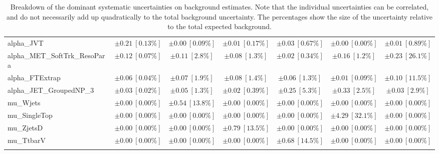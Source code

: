 \begin{sidewaystable}
\begin{center}
\begin{tabular*}{\textwidth}{@{\extracolsep{\fill}}lcccccc}
alpha\_JVT         & $\pm 0.21\ [0.13\%] $          & $\pm 0.00\ [0.09\%] $          & $\pm 0.01\ [0.17\%] $          & $\pm 0.03\ [0.67\%] $          & $\pm 0.00\ [0.00\%] $          & $\pm 0.01\ [0.89\%] $       \\
alpha\_MET\_SoftTrk\_ResoPara         & $\pm 0.12\ [0.07\%] $          & $\pm 0.11\ [2.8\%] $          & $\pm 0.08\ [1.3\%] $          & $\pm 0.02\ [0.34\%] $          & $\pm 0.16\ [1.2\%] $          & $\pm 0.23\ [26.1\%] $       \\
alpha\_FTExtrap         & $\pm 0.06\ [0.04\%] $          & $\pm 0.07\ [1.9\%] $          & $\pm 0.08\ [1.4\%] $          & $\pm 0.06\ [1.3\%] $          & $\pm 0.01\ [0.09\%] $          & $\pm 0.10\ [11.5\%] $       \\
alpha\_JET\_GroupedNP\_3         & $\pm 0.03\ [0.02\%] $          & $\pm 0.05\ [1.3\%] $          & $\pm 0.02\ [0.39\%] $          & $\pm 0.25\ [5.3\%] $          & $\pm 0.33\ [2.5\%] $          & $\pm 0.03\ [2.9\%] $       \\
mu\_Wjets         & $\pm 0.00\ [0.00\%] $          & $\pm 0.54\ [13.8\%] $          & $\pm 0.00\ [0.00\%] $          & $\pm 0.00\ [0.00\%] $          & $\pm 0.00\ [0.00\%] $          & $\pm 0.00\ [0.00\%] $       \\
mu\_SingleTop         & $\pm 0.00\ [0.00\%] $          & $\pm 0.00\ [0.00\%] $          & $\pm 0.00\ [0.00\%] $          & $\pm 0.00\ [0.00\%] $          & $\pm 4.29\ [32.1\%] $          & $\pm 0.00\ [0.00\%] $       \\
mu\_ZjetsD         & $\pm 0.00\ [0.00\%] $          & $\pm 0.00\ [0.00\%] $          & $\pm 0.79\ [13.5\%] $          & $\pm 0.00\ [0.00\%] $          & $\pm 0.00\ [0.00\%] $          & $\pm 0.00\ [0.00\%] $       \\
mu\_TtbarV         & $\pm 0.00\ [0.00\%] $          & $\pm 0.00\ [0.00\%] $          & $\pm 0.00\ [0.00\%] $          & $\pm 0.68\ [14.5\%] $          & $\pm 0.00\ [0.00\%] $          & $\pm 0.00\ [0.00\%] $       \\
\noalign{\smallskip}\hline\noalign{\smallskip}
\end{tabular*}
\end{center}
\caption[Breakdown of uncertainty on background estimates]{
Breakdown of the dominant systematic uncertainties on background estimates.
Note that the individual uncertainties can be correlated, and do not necessarily add up quadratically to 
the total background uncertainty. The percentages show the size of the uncertainty relative to the total expected background.
\label{table.results.bkgestimate.uncertainties.VRTopD_bybkg}}
\end{sidewaystable}
%